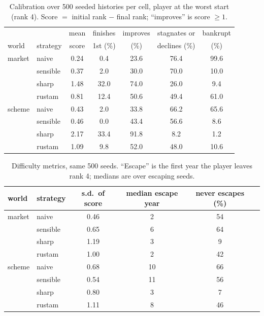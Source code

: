 \documentclass[11pt,a4paper]{article}
\begin{document}
\begin{table}[t]
\centering\small
\begin{tabular}{llccccc}
\toprule
 & & mean & \multicolumn{1}{c}{finishes} & improves & stagnates or & bankrupt \\
world & strategy & score & 1st (\%) & (\%) & declines (\%) & (\%) \\
\midrule
market & naive    & 0.24 & 0.4  & 23.6 & 76.4 & 99.6 \\
       & sensible & 0.37 & 2.0  & 30.0 & 70.0 & 10.0 \\
       & sharp    & 1.48 & 32.0 & 74.0 & 26.0 & 9.4 \\
       & rustam   & 0.81 & 12.4 & 50.6 & 49.4 & 61.0 \\
\addlinespace
scheme & naive    & 0.43 & 2.0  & 33.8 & 66.2 & 65.6 \\
       & sensible & 0.46 & 0.0  & 43.4 & 56.6 & 8.6 \\
       & sharp    & 2.17 & 33.4 & 91.8 & 8.2  & 1.2 \\
       & rustam   & 1.09 & 9.8  & 52.0 & 48.0 & 10.6 \\
\bottomrule
\end{tabular}
\caption{Calibration over 500 seeded histories per cell, player at the worst start (rank 4). Score $=$ initial rank $-$ final rank; ``improves'' is score $\ge 1$.}
\label{tab:calib}
\end{table}

\begin{table}[t]
\centering\small
\begin{tabular}{llcccc}
\toprule
world & strategy & s.d.\ of score & median escape year & never escapes (\%) \\
\midrule
market & naive    & 0.46 & 2    & 54 \\
       & sensible & 0.65 & 6    & 64 \\
       & sharp    & 1.19 & 3    & 9  \\
       & rustam   & 1.00 & 2    & 42 \\
\addlinespace
scheme & naive    & 0.68 & 10   & 66 \\
       & sensible & 0.54 & 11   & 56 \\
       & sharp    & 0.80 & 3    & 7  \\
       & rustam   & 1.11 & 8    & 46 \\
\bottomrule
\end{tabular}
\caption{Difficulty metrics, same 500 seeds. ``Escape'' is the first year the player leaves rank 4; medians are over escaping seeds.}
\label{tab:diff}
\end{table}
\end{document}
